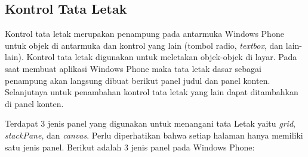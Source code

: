 \subsection{Kontrol Tata Letak \cite{MSDN}}
\label{subsubsec:Kontrol Tata Letak}
\hspace{0.5cm} Kontrol tata letak merupakan penampung pada antarmuka Windows Phone untuk objek di antarmuka dan kontrol yang lain (tombol radio, \textit{textbox}, dan lain-lain). Kontrol tata letak digunakan untuk meletakan objek-objek di layar. Pada saat membuat aplikasi Windows Phone maka tata letak dasar sebagai penampung akan langsung dibuat berikut panel judul dan panel konten. Selanjutnya untuk penambahan kontrol tata letak yang lain dapat ditambahkan di panel konten.


Terdapat 3 jenis panel yang digunakan untuk menangani tata Letak yaitu \textit{grid}, \textit{stackPane}, dan \textit{canvas}. Perlu diperhatikan bahwa setiap halaman hanya memiliki satu jenis panel. Berikut adalah 3 jenis panel pada Windows Phone:


